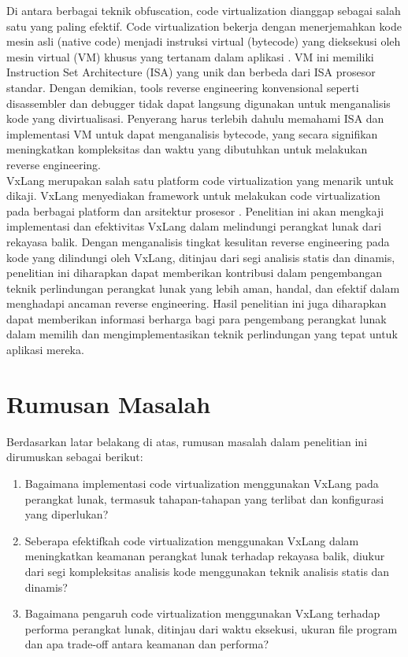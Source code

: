 Di antara berbagai teknik obfuscation, code virtualization dianggap sebagai salah satu yang paling efektif. Code virtualization bekerja dengan menerjemahkan kode mesin asli (native code) menjadi instruksi virtual (bytecode) yang dieksekusi oleh mesin virtual (VM) khusus yang tertanam dalam aplikasi \cite{Ore06}. VM ini memiliki Instruction Set Architecture (ISA) yang unik dan berbeda dari ISA prosesor standar. Dengan demikian, tools reverse engineering konvensional seperti disassembler dan debugger tidak dapat langsung digunakan untuk menganalisis kode yang divirtualisasi. Penyerang harus terlebih dahulu memahami ISA dan implementasi VM untuk dapat menganalisis bytecode, yang secara signifikan meningkatkan kompleksitas dan waktu yang dibutuhkan untuk melakukan reverse engineering. \\

VxLang merupakan salah satu platform code virtualization yang menarik untuk dikaji. VxLang menyediakan framework untuk melakukan code virtualization pada berbagai platform dan arsitektur prosesor \cite{VxLang}. Penelitian ini akan mengkaji implementasi dan efektivitas VxLang dalam melindungi perangkat lunak dari rekayasa balik. Dengan menganalisis tingkat kesulitan reverse engineering pada kode yang dilindungi oleh VxLang, ditinjau dari segi analisis statis dan dinamis, penelitian ini diharapkan dapat memberikan kontribusi dalam pengembangan teknik perlindungan perangkat lunak yang lebih aman, handal, dan efektif dalam menghadapi ancaman reverse engineering. Hasil penelitian ini juga diharapkan dapat memberikan informasi berharga bagi para pengembang perangkat lunak dalam memilih dan mengimplementasikan teknik perlindungan yang tepat untuk aplikasi mereka.
\section{Rumusan Masalah}
Berdasarkan latar belakang di atas, rumusan masalah dalam penelitian ini dirumuskan sebagai berikut:
\begin{enumerate}
	\item Bagaimana implementasi code virtualization menggunakan VxLang pada perangkat lunak, termasuk tahapan-tahapan yang terlibat dan konfigurasi yang diperlukan?
	\item Seberapa efektifkah code virtualization menggunakan VxLang dalam meningkatkan keamanan perangkat lunak terhadap rekayasa balik, diukur dari segi kompleksitas analisis kode menggunakan teknik analisis statis dan dinamis?

	\item Bagaimana pengaruh code virtualization menggunakan VxLang terhadap performa perangkat lunak, ditinjau dari waktu eksekusi, ukuran file program dan apa trade-off antara keamanan dan performa?

\end{enumerate}

